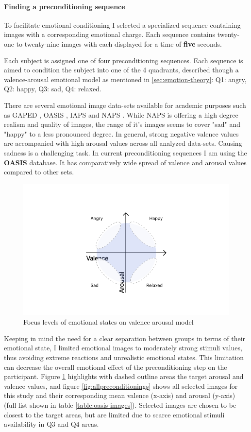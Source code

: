 \paragraph{Finding a preconditioning sequence}
To facilitate emotional conditioning I selected a specialized sequence containing images with a corresponding emotional charge.
Each sequence contains twenty-one to twenty-nine images with each displayed for a time of \textbf{five} seconds.

Each subject is assigned one of four preconditioning sequences. Each sequence is aimed to condition the subject into one of the 4 quadrants, described though a valence-arousal emotional model as mentioned in \ref{sec:emotion-theory}: Q1: angry, Q2: happy, Q3: sad, Q4: relaxed.

There are several emotional image data-sets available for academic purposes such as GAPED \cite{Dan-Glauser2011}, OASIS \cite{Kurdi2017}, IAPS \cite{Lang1997} and NAPS \cite{Marchewka2014}. While NAPS is offering a high degree realism and quality of images, the range of it's images seems to cover "sad" and "happy" to a less pronounced degree. In general, strong negative valence values are accompanied with high arousal values across all analyzed data-sets. Causing sadness is a challenging task. In current preconditioning sequences I am using the \textbf{OASIS} database. It has comparatively wide spread of valence and arousal values compared to other sets.

\begin{figure}
	\centering
	\includegraphics[width=0.7\linewidth]{graphics/Valence-Arousal-Model-1.png}
	\caption{Focus levels of emotional states on valence arousal model}
	\label{fig:valence-arousal-model-2}
\end{figure}

Keeping in mind the need for a clear separation between groups in terms of their emotional state, I limited emotional images to moderately strong stimuli values, thus avoiding extreme reactions and unrealistic emotional states. This limitation can decrease the overall emotional effect of the preconditioning step on the participant. Figure \ref{fig:valence-arousal-model-2} highlights with dashed outline areas the target arousal and valence values, and figure \ref{fig:allpreconditionings} shows all selected images for this study and their corresponding mean valence (x-axis) and arousal (y-axis) (full list shown in table \ref{table:oasis-images}). Selected images are chosen to be closest to the target areas, but are limited due to scarce emotional stimuli availability in Q3 and Q4 areas.

